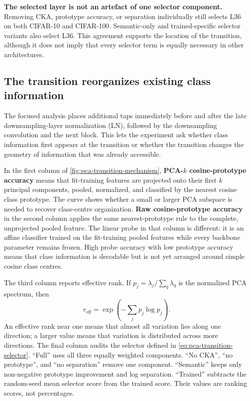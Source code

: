 

\textbf{The selected layer is not an artefact of one selector component.}
Removing CKA, prototype accuracy, or separation individually still selects L36
on both CIFAR-10 and CIFAR-100. Semantic-only and trained-specific selector
variants also select L36. This agreement supports the location of the
transition, although it does not imply that every selector term is equally
necessary in other architectures.

\subsection{The transition reorganizes existing class information}

The focused analysis places additional taps immediately before and after the
late downsampling-layer normalization (LN), followed by the downsampling
convolution and the next block. This lets the experiment ask whether class
information first appears at the transition or whether the transition changes
the geometry of information that was already accessible.

In the first column of \cref{fig:pca-transition-mechanism},
\textbf{PCA-$k$ cosine-prototype accuracy} means that fit-training features are
projected onto their first $k$ principal components, pooled, normalized, and
classified by the nearest cosine class prototype. The curve shows whether a
small or larger PCA subspace is needed to recover class-centre organization.
\textbf{Raw cosine-prototype accuracy} in the second column applies the same
nearest-prototype rule to the complete, unprojected pooled feature. The linear
probe in that column is different: it is an affine classifier trained on the
fit-training pooled features while every backbone parameter remains frozen.
High probe accuracy with low prototype accuracy means that class information is
decodable but is not yet arranged around simple cosine class centres.

The third column reports effective rank. If $p_j=\lambda_j/\sum_q\lambda_q$
is the normalized PCA spectrum, then
\begin{equation}
    r_{\mathrm{eff}}
    =\exp\left(-\sum_j p_j\log p_j\right).
    \label{eq:pca-effective-rank}
\end{equation}
An effective rank near one means that almost all variation lies along one
direction; a larger value means that variation is distributed across more
directions. The final column audits the selector defined in
\cref{eq:pca-transition-selector}. ``Full'' uses all three equally weighted
components. ``No CKA'', ``no prototype'', and ``no separation'' remove one
component. ``Semantic'' keeps only non-negative prototype improvement and log
separation. ``Trained'' subtracts the random-seed mean selector score from the
trained score. Their values are ranking scores, not percentages.

